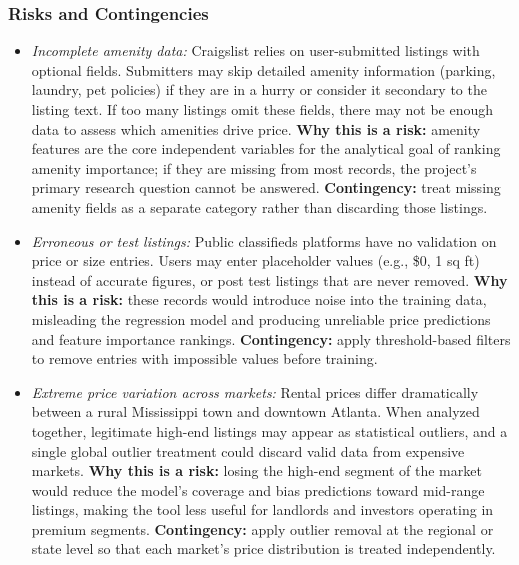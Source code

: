 \subsubsection*{Risks and Contingencies}
\vspace{-9pt}
\begin{itemize}[itemsep=-9pt]
    \item \textit{Incomplete amenity data:} Craigslist relies on user-submitted listings with optional fields. Submitters may skip detailed amenity information (parking, laundry, pet policies) if they are in a hurry or consider it secondary to the listing text. If too many listings omit these fields, there may not be enough data to assess which amenities drive price. \textbf{Why this is a risk:} amenity features are the core independent variables for the analytical goal of ranking amenity importance; if they are missing from most records, the project's primary research question cannot be answered. \textbf{Contingency:} treat missing amenity fields as a separate category rather than discarding those listings.
    \item \textit{Erroneous or test listings:} Public classifieds platforms have no validation on price or size entries. Users may enter placeholder values (e.g., \$0, 1 sq ft) instead of accurate figures, or post test listings that are never removed. \textbf{Why this is a risk:} these records would introduce noise into the training data, misleading the regression model and producing unreliable price predictions and feature importance rankings. \textbf{Contingency:} apply threshold-based filters to remove entries with impossible values before training.
    \item \textit{Extreme price variation across markets:} Rental prices differ dramatically between a rural Mississippi town and downtown Atlanta. When analyzed together, legitimate high-end listings may appear as statistical outliers, and a single global outlier treatment could discard valid data from expensive markets. \textbf{Why this is a risk:} losing the high-end segment of the market would reduce the model's coverage and bias predictions toward mid-range listings, making the tool less useful for landlords and investors operating in premium segments. \textbf{Contingency:} apply outlier removal at the regional or state level so that each market's price distribution is treated independently.
\end{itemize}

